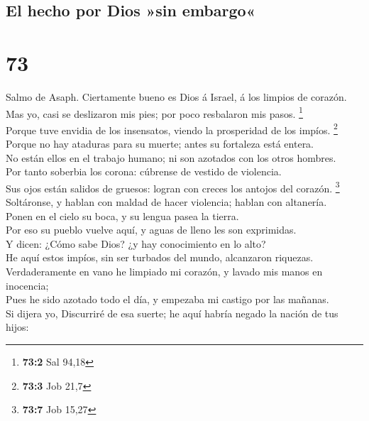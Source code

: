 \hypertarget{el-hecho-por-dios-sin-embargo}{%
\subsection{El hecho por Dios »sin
embargo«}\label{el-hecho-por-dios-sin-embargo}}

\hypertarget{section-72}{%
\section{73}\label{section-72}}

 Salmo de Asaph. Ciertamente bueno es Dios á Israel, á los
limpios de corazón.\\
 Mas yo, casi se deslizaron mis pies; por poco resbalaron
mis pasos. \footnote{\textbf{73:2} Sal 94,18}\\
 Porque tuve envidia de los insensatos, viendo la
prosperidad de los impíos. \footnote{\textbf{73:3} Job 21,7}\\
 Porque no hay ataduras para su muerte; antes su fortaleza
está entera.\\
 No están ellos en el trabajo humano; ni son azotados con
los otros hombres.\\
 Por tanto soberbia los corona: cúbrense de vestido de
violencia.\\
 Sus ojos están salidos de gruesos: logran con creces los
antojos del corazón. \footnote{\textbf{73:7} Job 15,27}\\
 Soltáronse, y hablan con maldad de hacer violencia;
hablan con altanería.\\
 Ponen en el cielo su boca, y su lengua pasea la tierra.\\
 Por eso su pueblo vuelve aquí, y aguas de lleno les son
exprimidas.\\
 Y dicen: ¿Cómo sabe Dios? ¿y hay conocimiento en lo
alto?\\
 He aquí estos impíos, sin ser turbados del mundo,
alcanzaron riquezas.\\
 Verdaderamente en vano he limpiado mi corazón, y lavado
mis manos en inocencia;\\
 Pues he sido azotado todo el día, y empezaba mi castigo
por las mañanas.\\
 Si dijera yo, Discurriré de esa suerte; he aquí habría
negado la nación de tus hijos:\\
